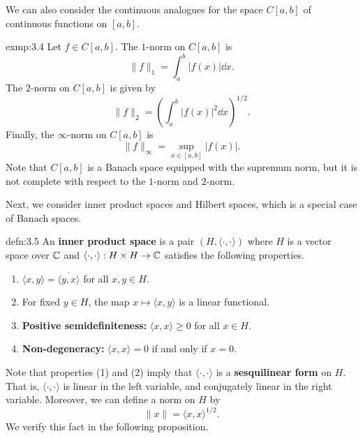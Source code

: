 We can also consider the continuous analogues for the space $C[a, b]$ 
of continuous functions on $[a, b]$.

\begin{exmp}{exmp:3.4}
    Let $f \in C[a, b]$. The $1$-norm on $C[a, b]$ is 
    \[ \|f\|_1 = \int_a^b |f(x)|\dd x. \] 
    The $2$-norm on $C[a, b]$ is given by 
    \[ \|f\|_2 = \left( \int_a^b |f(x)|^2\dd x \right)^{\!1/2}. \] 
    Finally, the $\infty$-norm on $C[a, b]$ is 
    \[ \|f\|_\infty = \sup_{x\in [a, b]} |f(x)|. \] 
    Note that $C[a, b]$ is a Banach space equipped with the supremum norm, 
    but it is not complete with respect to the $1$-norm and $2$-norm. 
\end{exmp}

Next, we consider inner product spaces and Hilbert spaces, which is
a special case of Banach spaces. 

\begin{defn}{defn:3.5} 
    An {\bf inner product space} is a pair $(H, \langle \cdot, \cdot \rangle)$ 
    where $H$ is a vector space over $\mathbb{C}$ and $\langle \cdot, \cdot \rangle
    : H \times H \to \mathbb{C}$ satisfies the following properties.
    \begin{enumerate}[(1)]
        \item $\langle x, y \rangle = \overline{\langle y, x \rangle}$
        for all $x, y \in H$. 
        \item For fixed $y \in H$, the map $x \mapsto \langle x, y \rangle$
        is a linear functional.
        \item {\bf Positive semidefiniteness:} $\langle x, x \rangle \geq 0$ 
        for all $x \in H$.
        \item {\bf Non-degeneracy:} $\langle x, x \rangle = 0$ if and only if 
        $x = 0$. 
    \end{enumerate} 
\end{defn}

Note that properties (1) and (2) imply that $\langle \cdot, \cdot \rangle$ 
is a {\bf sesquilinear form} on $H$. That is, $\langle \cdot, \cdot \rangle$ 
is linear in the left variable, and conjugately linear in the right 
variable. Moreover, we can define a norm on $H$ by 
\[ \|x\| = \langle x, x \rangle^{1/2}. \] 
We verify this fact in the following proposition. 

